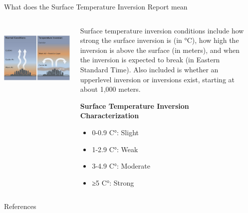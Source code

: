 \documentclass[final,xcolor=table]{beamer}
\newlength{\sepwidth}
\newlength{\colwidth}
\newcommand{\separatorcolumn}{\begin{column}{\sepwidth}\end{column}}
\begin{document}
\begin{frame}[t]
\begin{columns}[t]
\begin{column}{\colwidth}
\begin{block}{What does the Surface Temperature Inversion Report mean}
    \begin{columns}[T]
    \begin{column}{0.43\linewidth}
    ~\includegraphics[width=1\textwidth]{citypic.png}
    \end{column}
    \begin{column}{0.5\linewidth}
    
        Surface temperature inversion conditions include how strong the surface inversion is (in °C), how high the inversion is above the surface (in meters), and when the inversion is expected to break (in Eastern Standard Time). Also included is whether an upperlevel inversion or inversions exist, starting at about 1,000 meters.
        
        \textbf{Surface Temperature Inversion Characterization}
            \begin{itemize}
              \item 0-0.9 C°: Slight
              \item 1-2.9 C°: Weak
              \item 3-4.9 C°: Moderate
              \item ≥5 C°: Strong
            \end{itemize}
    \end{column}
    \end{columns}    


  \end{block}



  \begin{block}{References}

    \nocite{*}
    \footnotesize{}

  \end{block}

\end{column}

\separatorcolumn
\end{columns}
\end{frame}
\end{document}
